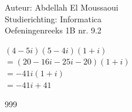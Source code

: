 \documentclass[a4paper]{article}
\begin{document}
  
\noindent \large Auteur: Abdellah El Moussaoui \\
\noindent \large Studierichting: Informatica\\
\noindent \large Oefeningenreeks 1B nr. 9.2\\

\medskip

\normalsize

$(4 - 5i)(5 - 4i)(1 + i)$\\

$= (20-16i-25i-20)(1 + i)$\\

$= -41i(1 + i)$\\

$= -41i + 41$\\

\begin{thebibliography}{999}
\end{thebibliography}
\end{document}
